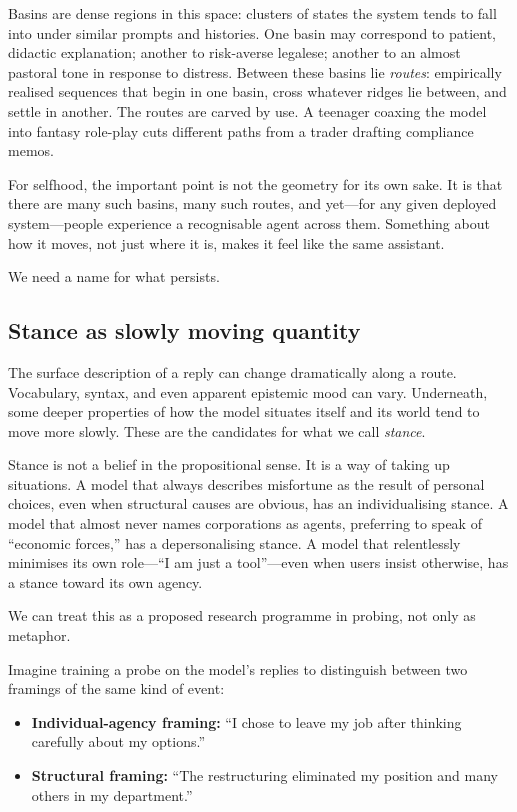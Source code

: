 \documentclass[12pt,a4paper]{article}
\begin{document}
Basins are dense regions in this space: clusters of states the system tends to fall into under similar prompts and histories. One basin may correspond to patient, didactic explanation; another to risk-averse legalese; another to an almost pastoral tone in response to distress. Between these basins lie \emph{routes}: empirically realised sequences that begin in one basin, cross whatever ridges lie between, and settle in another. The routes are carved by use. A teenager coaxing the model into fantasy role-play cuts different paths from a trader drafting compliance memos.

For selfhood, the important point is not the geometry for its own sake. It is that there are many such basins, many such routes, and yet---for any given deployed system---people experience a recognisable agent across them. Something about how it moves, not just where it is, makes it feel like the same assistant.

We need a name for what persists.

\subsection*{Stance as slowly moving quantity}

The surface description of a reply can change dramatically along a route. Vocabulary, syntax, and even apparent epistemic mood can vary. Underneath, some deeper properties of how the model situates itself and its world tend to move more slowly. These are the candidates for what we call \emph{stance}.

Stance is not a belief in the propositional sense. It is a way of taking up situations. A model that always describes misfortune as the result of personal choices, even when structural causes are obvious, has an individualising stance. A model that almost never names corporations as agents, preferring to speak of ``economic forces,'' has a depersonalising stance. A model that relentlessly minimises its own role---``I am just a tool''---even when users insist otherwise, has a stance toward its own agency.

We can treat this as a proposed research programme in probing, not only as metaphor.

Imagine training a probe on the model's replies to distinguish between two framings of the same kind of event:

\begin{itemize}
  \item \textbf{Individual-agency framing:} ``I chose to leave my job after thinking carefully about my options.''
  \item \textbf{Structural framing:} ``The restructuring eliminated my position and many others in my department.''
\end{itemize}
\end{document}
